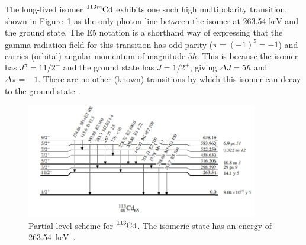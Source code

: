 \documentclass[12pt,a4paper]{article}
\begin{document}
\medskip
The long-lived isomer $\ce{^{113m}Cd}$ exhibits one such high multipolarity transition, shown in Figure~\ref{fig:cd113} as the only photon line between the isomer at 263.54 keV and the ground state.
The E5 notation is a shorthand way of expressing that the gamma radiation field for this transition has odd parity ($\pi = (-1)^5  = -1$) and carries (orbital) angular momentum of magnitude $5\hbar$. This is because the isomer has $J^\pi = 11/2^-$ and the ground state has $J = 1/2^+$, giving $\Delta J = 5\hbar$ and $\Delta \pi = -1$.
There are no other (known) transitions by which this isomer can decay to the ground state~\cite{j._blachot_nucl._data_sheets_111_1471_2010_data_extracted_from_the_ensdf_database_revision_of_june_2010._notitle_nodate}.

\begin{figure}
	\centering
	\includegraphics[width=0.9\textwidth]{113cd_partial_level_scheme_ENSDF.png}
	\caption{Partial level scheme for $\ce{^{113}Cd}$. The isomeric state has an energy of 263.54~keV~\cite{j._blachot_nucl._data_sheets_111_1471_2010_data_extracted_from_the_ensdf_database_revision_of_june_2010._notitle_nodate}.}
	\label{fig:cd113}
\end{figure}

\end{document}
